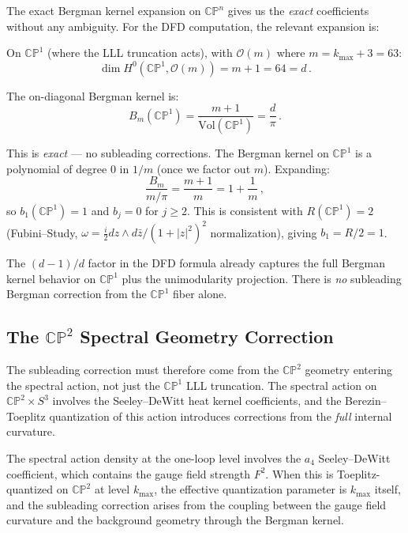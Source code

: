\documentclass[12pt,a4paper]{article}
\theoremstyle{definition}
\theoremstyle{remark}
\newcommand{\CP}{\mathbb{CP}}
\begin{document}
The exact Bergman kernel expansion on $\CP^n$ gives us the \emph{exact}
coefficients without any ambiguity. For the DFD computation, the relevant
expansion is:

On $\CP^1$ (where the LLL truncation acts), with $\mathcal{O}(m)$ where
$m = k_{\max} + 3 = 63$:
\begin{equation}
\dim H^0(\CP^1, \mathcal{O}(m)) = m + 1 = 64 = d\,.
\end{equation}

The on-diagonal Bergman kernel is:
\begin{equation}
B_m(\CP^1) = \frac{m+1}{\mathrm{Vol}(\CP^1)} = \frac{d}{\pi}\,.
\end{equation}

This is \emph{exact} --- no subleading corrections. The Bergman kernel
on $\CP^1$ is a polynomial of degree 0 in $1/m$ (once we factor out $m$).
Expanding:
\begin{equation}
\frac{B_m}{m/\pi} = \frac{m+1}{m} = 1 + \frac{1}{m}\,,
\end{equation}
so $b_1(\CP^1) = 1$ and $b_j = 0$ for $j \geq 2$. This is consistent with
$R(\CP^1) = 2$ (Fubini--Study, $\omega = \frac{i}{2}dz \wedge d\bar{z}/(1+|z|^2)^2$
normalization), giving $b_1 = R/2 = 1$.

The $(d-1)/d$ factor in the DFD formula already captures the full Bergman
kernel behavior on $\CP^1$ plus the unimodularity projection. There is
\emph{no} subleading Bergman correction from the $\CP^1$ fiber alone.

\subsection{The $\CP^2$ Spectral Geometry Correction}

The subleading correction must therefore come from the $\CP^2$ geometry
entering the spectral action, not just the $\CP^1$ LLL truncation. The
spectral action on $\CP^2 \times S^3$ involves the Seeley--DeWitt heat
kernel coefficients, and the Berezin--Toeplitz quantization of this action
introduces corrections from the \emph{full} internal curvature.

The spectral action density at the one-loop level involves the $a_4$
Seeley--DeWitt coefficient, which contains the gauge field strength $F^2$.
When this is Toeplitz-quantized on $\CP^2$ at level $k_{\max}$, the
effective quantization parameter is $k_{\max}$ itself, and the subleading
correction arises from the coupling between the gauge field curvature and
the background geometry through the Bergman kernel.
\end{document}
